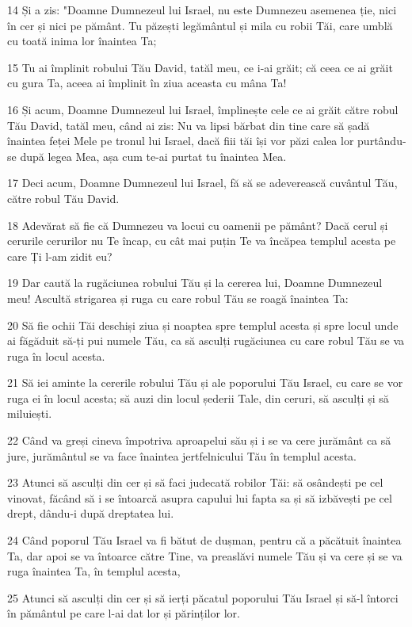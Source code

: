 \par 14 Și a zis: "Doamne Dumnezeul lui Israel, nu este Dumnezeu asemenea ție, nici în cer și nici pe pământ. Tu păzești legământul și mila cu robii Tăi, care umblă cu toată inima lor înaintea Ta;
\par 15 Tu ai împlinit robului Tău David, tatăl meu, ce i-ai grăit; că ceea ce ai grăit cu gura Ta, aceea ai împlinit în ziua aceasta cu mâna Ta!
\par 16 Și acum, Doamne Dumnezeul lui Israel, împlinește cele ce ai grăit către robul Tău David, tatăl meu, când ai zis: Nu va lipsi bărbat din tine care să șadă înaintea feței Mele pe tronul lui Israel, dacă fiii tăi își vor păzi calea lor purtându-se după legea Mea, așa cum te-ai purtat tu înaintea Mea.
\par 17 Deci acum, Doamne Dumnezeul lui Israel, fă să se adeverească cuvântul Tău, către robul Tău David.
\par 18 Adevărat să fie că Dumnezeu va locui cu oamenii pe pământ? Dacă cerul și cerurile cerurilor nu Te încap, cu cât mai puțin Te va încăpea templul acesta pe care Ți l-am zidit eu?
\par 19 Dar caută la rugăciunea robului Tău și la cererea lui, Doamne Dumnezeul meu! Ascultă strigarea și ruga cu care robul Tău se roagă înaintea Ta:
\par 20 Să fie ochii Tăi deschiși ziua și noaptea spre templul acesta și spre locul unde ai făgăduit să-ți pui numele Tău, ca să asculți rugăciunea cu care robul Tău se va ruga în locul acesta.
\par 21 Să iei aminte la cererile robului Tău și ale poporului Tău Israel, cu care se vor ruga ei în locul acesta; să auzi din locul șederii Tale, din ceruri, să asculți și să miluiești.
\par 22 Când va greși cineva împotriva aproapelui său și i se va cere jurământ ca să jure, jurământul se va face înaintea jertfelnicului Tău în templul acesta.
\par 23 Atunci să asculți din cer și să faci judecată robilor Tăi: să osândești pe cel vinovat, făcând să i se întoarcă asupra capului lui fapta sa și să izbăvești pe cel drept, dându-i după dreptatea lui.
\par 24 Când poporul Tău Israel va fi bătut de dușman, pentru că a păcătuit înaintea Ta, dar apoi se va întoarce către Tine, va preaslăvi numele Tău și va cere și se va ruga înaintea Ta, în templul acesta,
\par 25 Atunci să asculți din cer și să ierți păcatul poporului Tău Israel și să-l întorci în pământul pe care l-ai dat lor și părinților lor.
